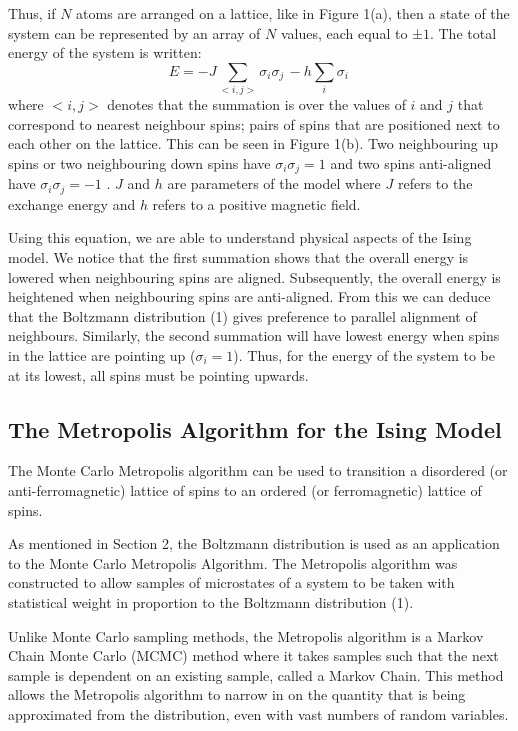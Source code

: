 \documentclass[a4paper]{article}
\begin{document}
Thus, if $N$ atoms are arranged on a lattice, like in Figure 1(a), then a state of the system can be represented by an array of $N$ values, each equal to ±$1$.
The total energy of the system is written:
\begin{equation}
E = -J\sum_{<i,j>} \sigma_{i}\sigma_{j} \, - h\sum_{i} \sigma_{i} \,
\end{equation}
where $<i,j>$ denotes that the summation is over the values of $i$ and $j$ that correspond to nearest neighbour spins; pairs of spins that are positioned next to each other on the lattice. This can be seen in Figure 1(b). Two neighbouring up spins or two neighbouring down spins have $\sigma_{i}\sigma_{j} = 1$ and two spins anti-aligned have $\sigma_{i}\sigma_{j}= -1$ \cite{2}. $J$ and $h$ are parameters of the model where $J$ refers to the exchange energy and $h$ refers to a positive magnetic field.

Using this equation, we are able to understand physical aspects of the Ising model. We notice that the first summation shows that the overall energy is lowered when neighbouring spins are aligned. Subsequently, the overall energy is heightened when neighbouring spins are anti-aligned. From this we can deduce that the Boltzmann distribution (1) gives preference to parallel alignment of neighbours. Similarly, the second summation will have lowest energy when spins in the lattice are pointing up ($\sigma_{i} = 1$). Thus, for the energy of the system to be at its lowest, all spins must be pointing upwards. 

\subsection{The Metropolis Algorithm for the Ising Model}

The Monte Carlo Metropolis algorithm \cite{5} can be used to transition a disordered (or anti-ferromagnetic) lattice of spins to an ordered (or ferromagnetic) lattice of spins.

As mentioned in Section 2, the Boltzmann distribution is used as an application to the Monte Carlo Metropolis Algorithm. The Metropolis algorithm was constructed to allow samples of microstates of a system to be taken with statistical weight in proportion to the Boltzmann distribution (1). 

Unlike Monte Carlo sampling methods, the Metropolis algorithm is a Markov Chain Monte Carlo (MCMC) method \cite{6} where it takes samples such that the next sample is dependent on an existing sample, called a Markov Chain. This method allows the Metropolis algorithm to narrow in on the quantity that is being approximated from the distribution, even with vast numbers of random variables. 
\end{document}
